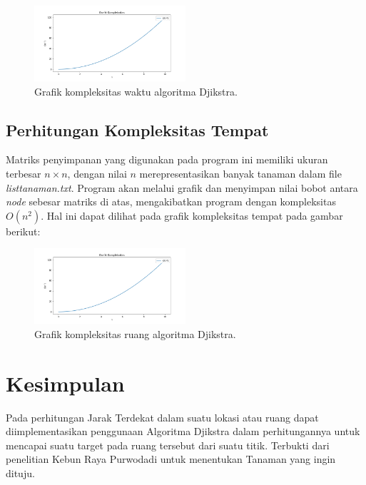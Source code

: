 \documentclass[conference]{IEEEtran}
\begin{document}
    \begin{figure}[H]
        \centerline{\includegraphics[width=0.5\textwidth]{./sources/onn.png}}
        \caption{Grafik kompleksitas waktu algoritma Djikstra.}
        \label{fig8}
    \end{figure}

\subsection{Perhitungan Kompleksitas Tempat}
    Matriks penyimpanan yang digunakan pada program ini
    memiliki ukuran terbesar $n \times n$, dengan nilai $n$ merepresentasikan banyak tanaman dalam file \textit{listtanaman.txt}. Program
    akan melalui grafik dan menyimpan nilai bobot antara \textit{node}
    sebesar matriks di atas, mengakibatkan program dengan kompleksitas $O(n^2)$. Hal ini dapat dilihat pada grafik kompleksitas
    tempat pada gambar berikut:

    \begin{figure}[H]
        \centerline{\includegraphics[width=0.5\textwidth]{./sources/onn.png}}
        \caption{Grafik kompleksitas ruang algoritma Djikstra.}
        \label{fig9}
    \end{figure}

\section{Kesimpulan}

    Pada perhitungan Jarak Terdekat dalam suatu lokasi atau ruang dapat diimplementasikan penggunaan Algoritma Djikstra
    dalam perhitungannya untuk mencapai suatu target pada ruang tersebut dari suatu titik. Terbukti dari penelitian Kebun Raya
    Purwodadi untuk menentukan Tanaman yang ingin dituju.




\end{document}
